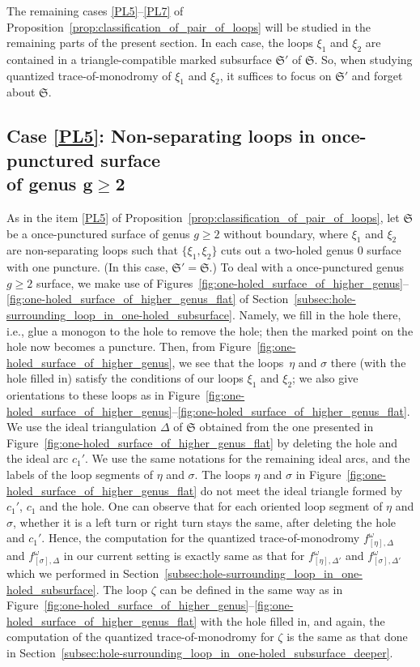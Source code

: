 \documentclass[pdftex]{sigma}
\numberwithin{equation}{section}
\theoremstyle{definition}
\begin{document}
The remaining cases \ref{PL5}--\ref{PL7} of Proposition~\ref{prop:classification_of_pair_of_loops} will be studied in the remaining parts of the present section. In each case, the loops $\xi_1$ and $\xi_2$ are contained in a triangle-compatible marked subsurface $\mathfrak{S}'$ of $\mathfrak{S}$. So, when studying quantized trace-of-monodromy of $\xi_1$ and $\xi_2$, it suffices to focus on $\mathfrak{S}'$ and forget about $\mathfrak{S}$.
\subsection[Case {\ref{PL5}}: Non-separating loops in once-punctured surface of genus g>=2]{Case {\ref{PL5}}: Non-separating loops in once-punctured surface\\ of genus $\boldsymbol{g\ge 2}$}
\label{subsec:Case5_commutativity}
As in the item \ref{PL5} of Proposition~\ref{prop:classification_of_pair_of_loops}, let $\mathfrak{S}$ be a once-punctured surface of genus $g\ge 2$ without boundary, where $\xi_1$ and $\xi_2$ are non-separating loops such that $\{\xi_1,\xi_2\}$ cuts out a two-holed genus $0$ surface with one puncture. (In this case, $\mathfrak{S}' = \mathfrak{S}$.)
To deal with a once-punctured genus $g\ge 2$ surface, we make use of Figures~\ref{fig:one-holed_surface_of_higher_genus}--\ref{fig:one-holed_surface_of_higher_genus_flat} of Section~\ref{subsec:hole-surrounding_loop_in_one-holed_subsurface}. Namely, we fill in the hole there, i.e., glue a monogon to the hole to remove the hole; then the marked point on the hole now becomes a puncture. Then, from Figure~\ref{fig:one-holed_surface_of_higher_genus}, we see that the loops~$\eta$ and $\sigma$ there (with the hole filled in) satisfy the conditions of our loops $\xi_1$ and $\xi_2$; we also give orientations to these loops as in Figure~\ref{fig:one-holed_surface_of_higher_genus}--\ref{fig:one-holed_surface_of_higher_genus_flat}. We use the ideal triangulation $\Delta$ of $\mathfrak{S}$ obtained from the one presented in Figure~\ref{fig:one-holed_surface_of_higher_genus_flat} by deleting the hole and the ideal arc $c_1'$. We use the same notations for the remaining ideal arcs, and the labels of the loop segments of $\eta$ and $\sigma$. The loops $\eta$ and $\sigma$ in Figure~\ref{fig:one-holed_surface_of_higher_genus_flat} do not meet the ideal triangle formed by $c_1'$, $c_1$ and the hole. One can observe that for each oriented loop segment of $\eta$ and $\sigma$, whether it is a left turn or right turn stays the same, after deleting the hole and $c_1'$. Hence, the computation for the quantized trace-of-monodromy $f^\omega_{[\eta],\Delta}$ and $f^\omega_{[\sigma],\Delta}$ in our current setting is exactly same as that for $f^\omega_{[\eta],\Delta'}$ and $f^\omega_{[\sigma],\Delta'}$ which we performed in Section~\ref{subsec:hole-surrounding_loop_in_one-holed_subsurface}. The loop $\zeta$ can be defined in the same way as in Figure~\ref{fig:one-holed_surface_of_higher_genus}--\ref{fig:one-holed_surface_of_higher_genus_flat} with the hole filled in, and again, the computation of the quantized trace-of-monodromy for $\zeta$ is the same as that done in Section~\ref{subsec:hole-surrounding_loop_in_one-holed_subsurface_deeper}.
\end{document}
